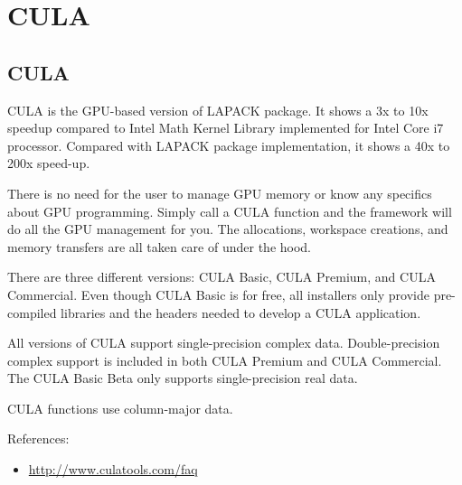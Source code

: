 
\chapter{CULA}
\label{chap:cula}


\section{CULA}
\label{sec:cula}

CULA is the GPU-based version of LAPACK package. It shows a 3x to 10x
speedup compared to Intel Math Kernel Library implemented for Intel
Core i7 processor. Compared with LAPACK package implementation, it
shows a 40x to 200x speed-up.


There is no need for the user to manage GPU memory or know any
specifics about GPU programming. Simply call a CULA function and the
framework will do all the GPU management for you. The allocations,
workspace creations, and memory transfers are all taken care of under
the hood. 

There are three different versions: CULA Basic, CULA Premium, and CULA
Commercial. Even though CULA Basic is for free, all installers only
provide pre-compiled libraries and the headers needed to develop a
CULA application.

All versions of CULA support single-precision complex
data. Double-precision complex support is included in both CULA
Premium and CULA Commercial. The CULA Basic Beta only supports
single-precision real data. 

CULA functions use column-major data.

References:
\begin{itemize}
\item \url{http://www.culatools.com/faq}
\end{itemize}

